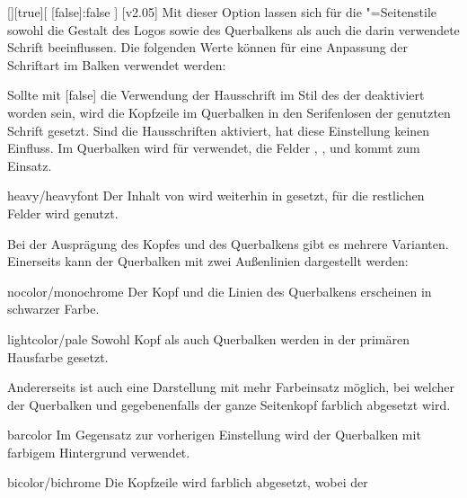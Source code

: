 \begin{Declaration}{[\PSet]}[true][%
  [false]:false%
]
\printdeclarationlist%
%
%
%
[v2.05]
Mit dieser Option lassen sich für die "=Seitenstile 
sowohl die Gestalt des Logos sowie des Querbalkens als auch die darin 
verwendete Schrift beeinflussen. Die folgenden Werte können für eine Anpassung 
der Schriftart im Balken verwendet werden:
%
\begin{values}
\itemfalse
  Sollte mit [false] die Verwendung der Hausschrift im Stil des 
  \CDs der \TnUD deaktiviert worden sein, wird die Kopfzeile im Querbalken in
  den Serifenlosen der genutzten Schrift gesetzt. Sind die Hausschriften 
  aktiviert, hat diese Einstellung keinen Einfluss.
  Im Querbalken wird für   verwendet, 
  die Felder , ,  und 
   kommt  zum Einsatz.
\item[heavy/heavyfont]
  Der Inhalt von  wird weiterhin in  
  gesetzt, für die restlichen Felder wird  genutzt.
\end{values}
%
Bei der Ausprägung des Kopfes und des Querbalkens gibt es mehrere Varianten. 
Einerseits kann der Querbalken mit zwei Außenlinien dargestellt werden:
%
\begin{values}
\item[nocolor/monochrome]
  Der Kopf und die Linien des Querbalkens erscheinen in schwarzer Farbe.
\item[lightcolor/pale]
  Sowohl Kopf als auch Querbalken werden in der primären Hausfarbe gesetzt.
\end{values}
%
Andererseits ist auch eine Darstellung mit mehr Farbeinsatz möglich, bei 
welcher der Querbalken und gegebenenfalls der ganze Seitenkopf farblich 
abgesetzt wird.
%
\begin{values}
\item[barcolor]
   Im Gegensatz zur vorherigen Einstellung wird der 
  Querbalken mit farbigem Hintergrund verwendet.
\item[bicolor/bichrome]
   Die Kopfzeile wird farblich abgesetzt, wobei der 

\end{values}
\end{Declaration}
